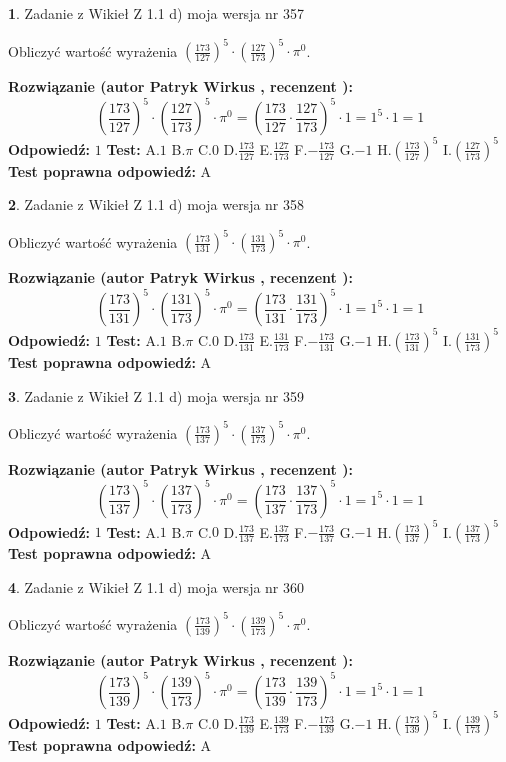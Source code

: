 \documentclass[12pt, a4paper]{article}
\theoremstyle{definition} %
\newtheorem{zad}{}
\newcommand{\zadStart}[1]{\begin{zad}#1\newline}
\newcommand{\zadStop}{\end{zad}}
\newcommand{\rozwStart}[2]{\noindent \textbf{Rozwiązanie (autor #1 , recenzent #2): }\newline}
\newcommand{\rozwStop}{\newline}
\newcommand{\odpStart}{\noindent \textbf{Odpowiedź:}\newline}
\newcommand{\odpStop}{\newline}
\newcommand{\testStart}{\noindent \textbf{Test:}\newline}
\newcommand{\testStop}{\newline}
\newcommand{\kluczStart}{\noindent \textbf{Test poprawna odpowiedź:}\newline}
\newcommand{\kluczStop}{\newline}
\begin{document}
\zadStart{Zadanie z Wikieł Z 1.1 d) moja wersja nr 357}

Obliczyć wartość wyrażenia $(\frac{173}{127})^{5} \cdot (\frac{127}{173})^{5} \cdot \pi^{0}$.
\zadStop
\rozwStart{Patryk Wirkus}{}
$$(\frac{173}{127})^{5} \cdot (\frac{127}{173})^{5} \cdot \pi^{0} = (\frac{173}{127} \cdot \frac{127}{173})^{5} \cdot 1 = 1^{5} \cdot 1 = 1$$
\rozwStop
\odpStart
$1$
\odpStop
\testStart
A.$1$ B.$\pi$ C.$0$ D.$\frac{173}{127}$ E.$\frac{127}{173}$
F.$-\frac{173}{127}$ G.$-1$
H.$(\frac{173}{127})^{5}$
I.$(\frac{127}{173})^{5}$
\testStop
\kluczStart
A
\kluczStop



\zadStart{Zadanie z Wikieł Z 1.1 d) moja wersja nr 358}

Obliczyć wartość wyrażenia $(\frac{173}{131})^{5} \cdot (\frac{131}{173})^{5} \cdot \pi^{0}$.
\zadStop
\rozwStart{Patryk Wirkus}{}
$$(\frac{173}{131})^{5} \cdot (\frac{131}{173})^{5} \cdot \pi^{0} = (\frac{173}{131} \cdot \frac{131}{173})^{5} \cdot 1 = 1^{5} \cdot 1 = 1$$
\rozwStop
\odpStart
$1$
\odpStop
\testStart
A.$1$ B.$\pi$ C.$0$ D.$\frac{173}{131}$ E.$\frac{131}{173}$
F.$-\frac{173}{131}$ G.$-1$
H.$(\frac{173}{131})^{5}$
I.$(\frac{131}{173})^{5}$
\testStop
\kluczStart
A
\kluczStop



\zadStart{Zadanie z Wikieł Z 1.1 d) moja wersja nr 359}

Obliczyć wartość wyrażenia $(\frac{173}{137})^{5} \cdot (\frac{137}{173})^{5} \cdot \pi^{0}$.
\zadStop
\rozwStart{Patryk Wirkus}{}
$$(\frac{173}{137})^{5} \cdot (\frac{137}{173})^{5} \cdot \pi^{0} = (\frac{173}{137} \cdot \frac{137}{173})^{5} \cdot 1 = 1^{5} \cdot 1 = 1$$
\rozwStop
\odpStart
$1$
\odpStop
\testStart
A.$1$ B.$\pi$ C.$0$ D.$\frac{173}{137}$ E.$\frac{137}{173}$
F.$-\frac{173}{137}$ G.$-1$
H.$(\frac{173}{137})^{5}$
I.$(\frac{137}{173})^{5}$
\testStop
\kluczStart
A
\kluczStop



\zadStart{Zadanie z Wikieł Z 1.1 d) moja wersja nr 360}

Obliczyć wartość wyrażenia $(\frac{173}{139})^{5} \cdot (\frac{139}{173})^{5} \cdot \pi^{0}$.
\zadStop
\rozwStart{Patryk Wirkus}{}
$$(\frac{173}{139})^{5} \cdot (\frac{139}{173})^{5} \cdot \pi^{0} = (\frac{173}{139} \cdot \frac{139}{173})^{5} \cdot 1 = 1^{5} \cdot 1 = 1$$
\rozwStop
\odpStart
$1$
\odpStop
\testStart
A.$1$ B.$\pi$ C.$0$ D.$\frac{173}{139}$ E.$\frac{139}{173}$
F.$-\frac{173}{139}$ G.$-1$
H.$(\frac{173}{139})^{5}$
I.$(\frac{139}{173})^{5}$
\testStop
\kluczStart
A
\kluczStop
\end{document}
